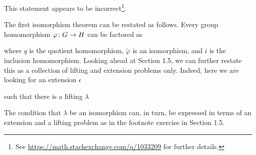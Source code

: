 \bs
\ben[label=(\alph*)]
\item This statement appears to be incorrect\footnote{See \url{https://math.stackexchange.com/q/1033209} for further details.}.
\item The first isomorphism theorem can be restated as follows. Every group homomorphism $\varphi\colon G\to H$ can be factored as
\bse
{}
\ese
where $q$ is the quotient homomorphism, $\widetilde \varphi$ is an isomorphism, and $i$ is the inclusion homomorphism. Looking ahead at Section 1.5, we can further restate this as a collection of lifting and extension problems only. Indeed, here we are looking for an extension $\epsilon$
\bse
{}
\ese
such that there is a lifting $\lambda$
\bse
{}
\ese
The condition that $\lambda$ be an isomorphism can, in turn, be expressed in terms of an extension and a lifting problem as in the footnote exercise in Section 1.5.

